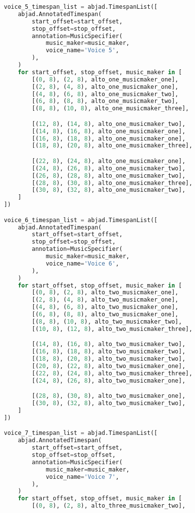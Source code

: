 \begin{lstlisting}[language=Python, caption=Invocation Source Code]
voice_5_timespan_list = abjad.TimespanList([
    abjad.AnnotatedTimespan(
        start_offset=start_offset,
        stop_offset=stop_offset,
        annotation=MusicSpecifier(
            music_maker=music_maker,
            voice_name='Voice 5',
        ),
    )
    for start_offset, stop_offset, music_maker in [
        [(0, 8), (2, 8), alto_one_musicmaker_one],
        [(2, 8), (4, 8), alto_one_musicmaker_one],
        [(4, 8), (6, 8), alto_one_musicmaker_two],
        [(6, 8), (8, 8), alto_one_musicmaker_two],
        [(8, 8), (10, 8), alto_one_musicmaker_three],

        [(12, 8), (14, 8), alto_one_musicmaker_two],
        [(14, 8), (16, 8), alto_one_musicmaker_one],
        [(16, 8), (18, 8), alto_one_musicmaker_one],
        [(18, 8), (20, 8), alto_one_musicmaker_three],

        [(22, 8), (24, 8), alto_one_musicmaker_one],
        [(24, 8), (26, 8), alto_one_musicmaker_two],
        [(26, 8), (28, 8), alto_one_musicmaker_two],
        [(28, 8), (30, 8), alto_one_musicmaker_three],
        [(30, 8), (32, 8), alto_one_musicmaker_two],
    ]
])

voice_6_timespan_list = abjad.TimespanList([
    abjad.AnnotatedTimespan(
        start_offset=start_offset,
        stop_offset=stop_offset,
        annotation=MusicSpecifier(
            music_maker=music_maker,
            voice_name='Voice 6',
        ),
    )
    for start_offset, stop_offset, music_maker in [
        [(0, 8), (2, 8), alto_two_musicmaker_one],
        [(2, 8), (4, 8), alto_two_musicmaker_one],
        [(4, 8), (6, 8), alto_two_musicmaker_one],
        [(6, 8), (8, 8), alto_two_musicmaker_one],
        [(8, 8), (10, 8), alto_two_musicmaker_two],
        [(10, 8), (12, 8), alto_two_musicmaker_three],

        [(14, 8), (16, 8), alto_two_musicmaker_two],
        [(16, 8), (18, 8), alto_two_musicmaker_two],
        [(18, 8), (20, 8), alto_two_musicmaker_two],
        [(20, 8), (22, 8), alto_two_musicmaker_one],
        [(22, 8), (24, 8), alto_two_musicmaker_three],
        [(24, 8), (26, 8), alto_two_musicmaker_one],

        [(28, 8), (30, 8), alto_two_musicmaker_one],
        [(30, 8), (32, 8), alto_two_musicmaker_two],
    ]
])

voice_7_timespan_list = abjad.TimespanList([
    abjad.AnnotatedTimespan(
        start_offset=start_offset,
        stop_offset=stop_offset,
        annotation=MusicSpecifier(
            music_maker=music_maker,
            voice_name='Voice 7',
        ),
    )
    for start_offset, stop_offset, music_maker in [
        [(0, 8), (2, 8), alto_three_musicmaker_two],


\end{lstlisting}
